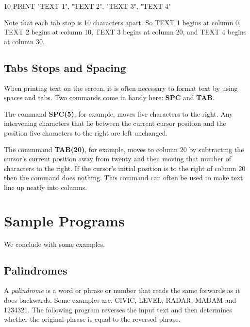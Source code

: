 \begin{screenoutput}
10 PRINT "TEXT 1", "TEXT 2", "TEXT 3", "TEXT 4"
\end{screenoutput}

Note that each tab stop is 10 characters apart. So TEXT 1 begins at column 0, TEXT 2 begins at column 10, TEXT 3 begins at column 20, and TEXT 4 begins at column 30. 

\subsection{Tabs Stops and Spacing}
When printing text on the screen, it is often necessary to format text by using spaces and tabs. Two commands come in handy here: {\bf SPC} and {\bf TAB}. 

The command {\bf SPC(5)}, for example, moves five characters to the right. Any intervening characters that lie between the current cursor position and the position five characters to the right are left unchanged.

The commmand {\bf TAB(20)}, for example, moves to column 20 by subtracting the cursor's current position away from twenty and then moving that number of characters to the right. If the cursor's initial position is to the right of column 20 then the command does nothing. This command can often be used to make text line up neatly into columns.

\section{Sample Programs}

We conclude with some examples.

\subsection{Palindromes}

A {\it palindrome} is a word or phrase or number that reads the same forwards as it does backwards. Some examples are: CIVIC, LEVEL, RADAR, MADAM and 1234321. The following program reverses the input text and then determines whether the original phrase is equal to the reversed phrase.



